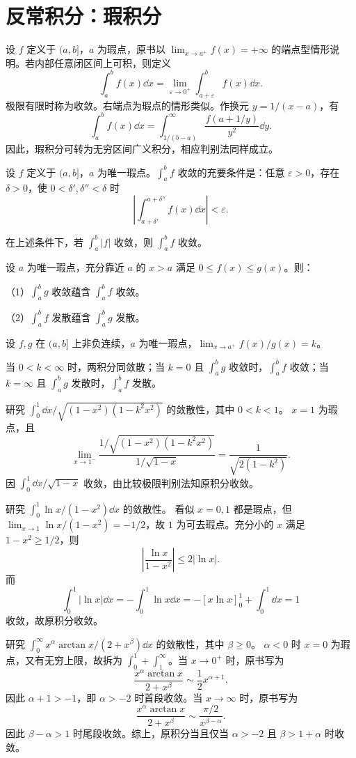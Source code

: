 \clearpage
\section{反常积分：瑕积分}
设 $f$ 定义于 $(a,b]$，$a$ 为瑕点，原书以 $\lim_{x\to a^+}f(x)=+\infty$ 的端点型情形说明。若内部任意闭区间上可积，则定义
\[
\int_a^bf(x)\dd x=\lim_{\varepsilon\to0^+}\int_{a+\varepsilon}^bf(x)\dd x.
\]
极限有限时称为收敛。右端点为瑕点的情形类似。作换元 $y=1/(x-a)$，有
\[
\int_a^bf(x)\dd x=\int_{1/(b-a)}^\infty\frac{f(a+1/y)}{y^2}\dd y.
\]
因此，瑕积分可转为无穷区间广义积分，相应判别法同样成立。

设 $f$ 定义于 $(a,b]$，$a$ 为唯一瑕点。$\int_a^bf$ 收敛的充要条件是：任意 $\varepsilon>0$，存在 $\delta>0$，使 $0<\delta',\delta''<\delta$ 时
\[
\left|\int_{a+\delta'}^{a+\delta''}f(x)\dd x\right|<\varepsilon.
\]

在上述条件下，若 $\int_a^b|f|$ 收敛，则 $\int_a^bf$ 收敛。

设 $a$ 为唯一瑕点，充分靠近 $a$ 的 $x>a$ 满足 $0\le f(x)\le g(x)$。则：

（1）$\int_a^bg$ 收敛蕴含 $\int_a^bf$ 收敛。

（2）$\int_a^bf$ 发散蕴含 $\int_a^bg$ 发散。

设 $f,g$ 在 $(a,b]$ 上非负连续，$a$ 为唯一瑕点，$\lim_{x\to a^+}f(x)/g(x)=k$。

当 $0<k<\infty$ 时，两积分同敛散；当 $k=0$ 且 $\int_a^bg$ 收敛时，$\int_a^bf$ 收敛；当 $k=\infty$ 且 $\int_a^bg$ 发散时，$\int_a^bf$ 发散。

研究 $\int_0^1\dd x/\sqrt{(1-x^2)(1-k^2x^2)}$ 的敛散性，其中 $0<k<1$。
\sol $x=1$ 为瑕点，且
\[
\lim_{x\to1^-}\frac{1/\sqrt{(1-x^2)(1-k^2x^2)}}{1/\sqrt{1-x}}
=\frac1{\sqrt{2(1-k^2)}}.
\]
因 $\int_0^1\dd x/\sqrt{1-x}$ 收敛，由比较极限判别法知原积分收敛。

研究 $\int_0^1\ln x/(1-x^2)\dd x$ 的敛散性。
\sol 看似 $x=0,1$ 都是瑕点，但 $\lim_{x\to1}\ln x/(1-x^2)=-1/2$，故 $1$ 为可去瑕点。充分小的 $x$ 满足 $1-x^2\ge1/2$，则
\[
\left|\frac{\ln x}{1-x^2}\right|\le2|\ln x|.
\]
而
\[
\int_0^1|\ln x|\dd x=-\int_0^1\ln x\dd x
=-[x\ln x]_0^1+\int_0^1\dd x=1
\]
收敛，故原积分收敛。

研究 $\int_0^\infty x^\alpha\arctan x/(2+x^\beta)\dd x$ 的敛散性，其中 $\beta\ge0$。
\sol $\alpha<0$ 时 $x=0$ 为瑕点，又有无穷上限，故拆为 $\int_0^1+\int_1^\infty$。当 $x\to0^+$ 时，原书写为
\[
\frac{x^\alpha\arctan x}{2+x^\beta}\sim\frac12x^{\alpha+1}.
\]
因此 $\alpha+1>-1$，即 $\alpha>-2$ 时首段收敛。当 $x\to\infty$ 时，原书写为
\[
\frac{x^\alpha\arctan x}{2+x^\beta}\sim\frac{\pi/2}{x^{\beta-\alpha}}.
\]
因此 $\beta-\alpha>1$ 时尾段收敛。综上，原积分当且仅当 $\alpha>-2$ 且 $\beta>1+\alpha$ 时收敛。

